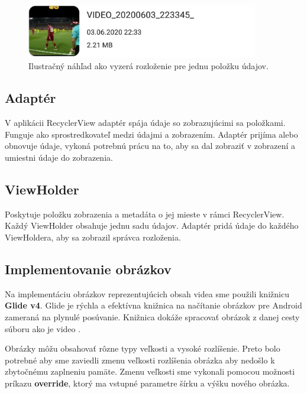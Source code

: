 \documentclass[12pt, oneside]{book}
\begin{document}
\begin{figure}[h]
    \centering
    \includegraphics[width=0.9\textwidth]{images/polozka.jpg}
    \caption{Ilustračný náhľad ako vyzerá rozloženie pre jednu položku údajov. }
    \label{fig:obr08}
\end{figure}

\subsection{Adaptér}

\hspace{15pt} V aplikácii RecyclerView adaptér spája údaje so zobrazujúcimi sa položkami. Funguje ako sprostredkovateľ medzi údajmi a zobrazením. Adaptér prijíma alebo obnovuje údaje, vykoná potrebnú prácu na to, aby sa dal zobraziť v zobrazení a umiestni údaje do zobrazenia.

\subsection{ViewHolder}

\hspace{15pt} Poskytuje položku zobrazenia a metadáta o jej mieste v rámci RecyclerView. Každý ViewHolder obsahuje jednu sadu údajov. Adaptér pridá údaje do každého ViewHoldera, aby sa zobrazil správca rozloženia.

\subsection{Implementovanie obrázkov}

\hspace{15pt} Na implementáciu obrázkov reprezentujúcich obsah videa sme použili knižnicu \textbf{Glide v4}. Glide je rýchla a efektívna knižnica na načítanie obrázkov pre Android zameraná na plynulé posúvanie. Knižnica dokáže spracovať obrázok z danej cesty súboru ako je video \cite{glide}.

Obrázky môžu obsahovať rôzne typy veľkosti a vysoké rozlíšenie. Preto bolo potrebné aby sme zaviedli zmenu veľkosti rozlíšenia obrázka aby nedošlo k zbytočnému zaplneniu pamäte. Zmenu veľkosti sme vykonali pomocou možnosti príkazu \textbf{override}, ktorý ma vstupné parametre šírku a výšku nového obrázka. 
\end{document}
